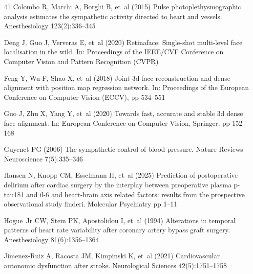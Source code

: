 \documentclass[pdflatex,sn-basic,Numbered]{sn-jnl}
\theoremstyle{thmstyleone}%
\theoremstyle{thmstyletwo}%
\theoremstyle{thmstylethree}%
\begin{document}
\begin{thebibliography}{41}
  Colombo R, Marchi A, Borghi B, et~al (2015) Pulse photoplethysmographic
  analysis estimates the sympathetic activity directed to heart and vessels.
  Anesthesiology 123(2):336--345

  Deng J, Guo J, Ververas E, et~al (2020) Retinaface: Single-shot multi-level
  face localisation in the wild. In: Proceedings of the IEEE/CVF Conference on
  Computer Vision and Pattern Recognition (CVPR)

  Feng Y, Wu F, Shao X, et~al (2018) Joint 3d face reconstruction and dense
  alignment with position map regression network. In: Proceedings of the
  European Conference on Computer Vision (ECCV), pp 534--551

  Guo J, Zhu X, Yang Y, et~al (2020) Towards fast, accurate and stable 3d dense
  face alignment. In: European Conference on Computer Vision, Springer, pp
  152--168

  Guyenet PG (2006) The sympathetic control of blood pressure. Nature Reviews
  Neuroscience 7(5):335--346

  Hansen N, Knopp CM, Esselmann H, et~al (2025) Prediction of postoperative
  delirium after cardiac surgery by the interplay between preoperative plasma
  p-tau181 and il-6 and heart-brain axis related factors: results from the
  prospective observational study finderi. Molecular Psychiatry pp 1--11

  Hogue~Jr CW, Stein PK, Apostolidou I, et~al (1994) Alterations in temporal
  patterns of heart rate variability after coronary artery bypass graft
  surgery. Anesthesiology 81(6):1356--1364

  Jimenez-Ruiz A, Racosta JM, Kimpinski K, et~al (2021) Cardiovascular autonomic
  dysfunction after stroke. Neurological Sciences 42(5):1751--1758


\end{thebibliography}
\end{document}
